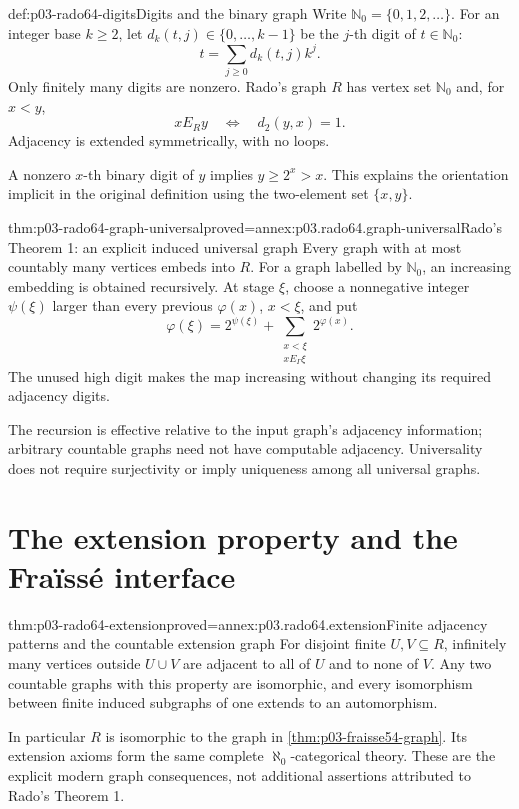 \begin{hbdefinition}{def:p03-rado64-digits}{Digits and the binary graph}
Write \(\mathbb N_0=\{0,1,2,\ldots\}\). For an integer base \(k\geq2\),
let \(d_k(t,j)\in\{0,\ldots,k-1\}\) be the \(j\)-th digit of \(t\in\mathbb N_0\):
\[
 t=\sum_{j\geq0}d_k(t,j)k^j.
\]
Only finitely many digits are nonzero. Rado's graph \(R\) has vertex set
\(\mathbb N_0\) and, for \(x<y\),
\[
 xE_Ry\quad\Longleftrightarrow\quad d_2(y,x)=1.
\]
Adjacency is extended symmetrically, with no loops.
\end{hbdefinition}

A nonzero \(x\)-th binary digit of \(y\) implies \(y\geq2^x>x\).
This explains the orientation implicit in the original definition using
the two-element set \(\{x,y\}\).

\begin{hbtheorem}{thm:p03-rado64-graph-universal}{proved=annex:p03.rado64.graph-universal}{Rado's Theorem 1: an explicit induced universal graph}
Every graph with at most countably many vertices embeds into \(R\).
For a graph labelled by \(\mathbb N_0\), an increasing embedding is obtained
recursively. At stage \(\xi\), choose a nonnegative integer \(\psi(\xi)\) larger than every
previous \(\varphi(x)\), \(x<\xi\), and put
\[
 \varphi(\xi)=2^{\psi(\xi)}
       +\sum_{\substack{x<\xi\\xE_\Gamma\xi}}2^{\varphi(x)}.
\]
The unused high digit makes the map increasing without changing its required
adjacency digits.
\end{hbtheorem}

The recursion is effective relative to the input graph's adjacency information;
arbitrary countable graphs need not have computable adjacency. Universality
does not require surjectivity or imply uniqueness among all universal graphs.

\section{The extension property and the Fra\"iss\'e interface}
\label{sec:p03-rado64-extension}

\begin{hbtheorem}{thm:p03-rado64-extension}{proved=annex:p03.rado64.extension}{Finite adjacency patterns and the countable extension graph}
For disjoint finite \(U,V\subseteq R\), infinitely many vertices outside
\(U\cup V\) are adjacent to all of \(U\) and to none of \(V\).
Any two countable graphs with this property are isomorphic, and every
isomorphism between finite induced subgraphs of one extends to an automorphism.

In particular \(R\) is isomorphic to the graph in
\cref{thm:p03-fraisse54-graph}. Its extension axioms form the same complete
\(\aleph_0\)-categorical theory. These are the explicit modern graph
consequences, not additional assertions attributed to Rado's Theorem 1.
\end{hbtheorem}

